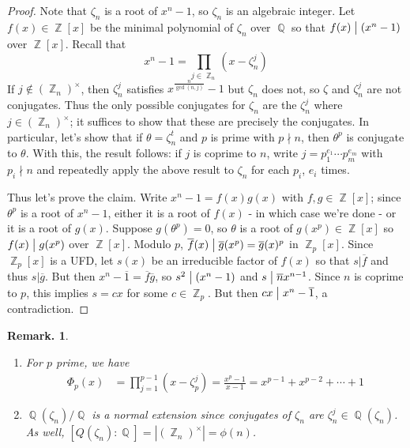 \documentclass[11pt, a4paper]{memoir}
\DeclareMathOperator{\Q}{{\mathbb{Q}}}
\DeclareMathOperator{\Z}{{\mathbb{Z}}}
\renewcommand{\div}{\bigm|}
\theoremstyle{change}
\theoremstyle{plain}
\theoremstyle{nonumberplain}
\newtheorem{remark}{Remark.}
\newtheorem{proof}{Proof}
\begin{document}
\begin{proof}
    Note that $\zeta_n$ is a root of $x^n-1$, so $\zeta_n$ is an algebraic integer.
    Let $f(x)\in\Z[x]$ be the minimal polynomial of $\zeta_n$ over $\Q$ so that $f(x)\div(x^n-1)$ over $\Z[x]$.
    Recall that
    \begin{equation*}
        x^n-1=\prod\limits_{j\in\Z_n}(x-\zeta_n^j)
    \end{equation*}
    If $j\notin(\Z_n)^\times$, then $\zeta_n^j$ satisfies $x^{\frac{n}{\gcd(n,j)}}-1$ but $\zeta_n$ does not, so $\zeta$ and $\zeta_n^j$ are not conjugates.
    Thus the only possible conjugates for $\zeta_n$ are the $\zeta_n^j$ where $j\in(\Z_n)^\times$; it suffices to show that these are precisely the conjugates.
    In particular, let's show that if $\theta=\zeta_n^t$ and $p$ is prime with $p\nmid n$, then $\theta^p$ is conjugate to $\theta$.
    With this, the result follows: if $j$ is coprime to $n$, write $j=p_1^{e_1}\cdots p_m^{e_m}$ with $p_i\nmid n$ and repeatedly apply the above result to $\zeta_n$ for each $p_i$, $e_i$ times.

    Thus let's prove the claim.
    Write $x^n-1=f(x)g(x)$ with $f,g\in\Z[x]$; since $\theta^p$ is a root of $x^n-1$, either it is a root of $f(x)$ - in which case we're done - or it is a root of $g(x)$.
    Suppose $g(\theta^p)=0$, so $\theta$ is a root of $g(x^p)\in\Z[x]$ so $f(x)\div g(x^p)$ over $\Z[x]$.
    Modulo $p$, $\overline{f}(x)\div\overline{g}(x^p)=\overline{g}(x)^p$ in $\Z_p[x]$.
    Since $\Z_p[x]$ is a UFD, let $s(x)$ be an irreducible factor of $f(x)$ so that $s|\overline{f}$ and thus $s|\overline{g}$.
    But then $x^{n}-\overline{1}=\overline{f}\overline{g}$, so $s^2\div(x^n-1)$ and $s\div\overline{n}x^{n-1}$.
    Since $n$ is coprime to $p$, this implies $s=cx$ for some $c\in\Z_p$.
    But then $cx\div x^n-\overline{1}$, a contradiction.
\end{proof}
\begin{remark}
    \begin{enumerate}[nl]
        \item For $p$ prime, we have
            \begin{align*}
                \Phi_p(x) &= \prod\limits_{j=1}^{p-1}(x-\zeta_p^j)= \frac{x^p-1}{x-1}= x^{p-1}+x^{p-2}+\cdots+1
            \end{align*}
        \item $\Q(\zeta_n)/\Q$ is a normal extension since conjugates of $\zeta_n$ are $\zeta_n^j\in\Q(\zeta_n)$.
            As well, $[Q(\zeta_n):\Q]=|(\Z_n)^\times|=\phi(n)$.
    \end{enumerate}
\end{remark}
\end{document}
